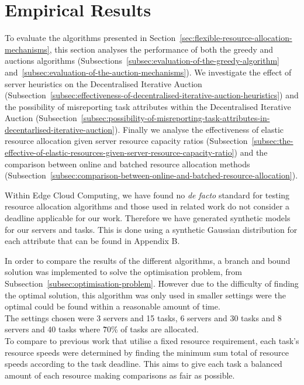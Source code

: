 \section{Empirical Results}
\label{sec:empirical-results}
To evaluate the algorithms presented in Section~\ref{sec:flexible-resource-allocation-mechanisms},
this section analyses the performance of both the greedy and auctions algorithms
(Subsections~\ref{subsec:evaluation-of-the-greedy-algorithm} and~\ref{subsec:evaluation-of-the-auction-mechanisms}).
We investigate the effect of server heuristics on the Decentralised Iterative Auction
(Subsection~\ref{subsec:effectiveness-of-decentralised-iterative-auction-heuristics}) and
the possibility of misreporting task attributes within the Decentralised Iterative Auction
(Subsection~\ref{subsec:possibility-of-misreporting-task-attributes-in-decentarlised-iterative-auction}).
Finally we analyse the effectiveness of elastic resource allocation given server resource capacity ratios
(Subsection~\ref{subsec:the-effective-of-elastic-resources-given-server-resource-capacity-ratio})
and the comparison between online and batched resource allocation methods
(Subsection~\ref{subsec:comparison-between-online-and-batched-resource-allocation}).

Within Edge Cloud Computing, we have found no \emph{de facto} standard for testing resource allocation algorithms and
those used in related work do not consider a deadline applicable for our work. Therefore we have generated synthetic
models for our servers and tasks. This is done using a synthetic Gaussian distribution for each attribute that can be
found in Appendix B\@.

In order to compare the results of the different algorithms, a branch and bound solution was implemented to solve
the optimisation problem, from Subsection~\ref{subsec:optimisation-problem}. However due to the difficulty of
finding the optimal solution, this algorithm was only used in smaller settings were the optimal could be found within
a reasonable amount of time. \\
The settings chosen were 3 servers and 15 tasks, 6 servers and 30 tasks and 8 servers and 40 tasks where \~70\% of
tasks are allocated. \\
To compare to previous work that utilise a fixed resource requirement, each task's resource speeds were determined by
finding the minimum sum total of resource speeds according to the task deadline. This aims to give each task a
balanced amount of each resource making comparisons as fair as possible.

